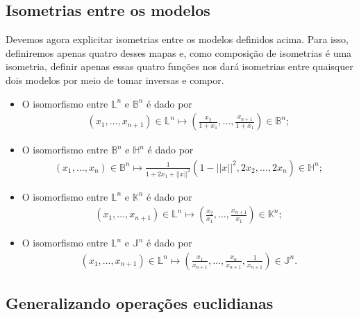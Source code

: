 \documentclass{article}
\begin{document}
\subsection{Isometrias entre os modelos}

Devemos agora explicitar isometrias entre os modelos definidos acima. Para isso, definiremos apenas quatro desses mapas e, como composição de isometrias é uma isometria, definir apenas essas quatro funções nos dará isometrias entre quaisquer dois modelos por meio de tomar inversas e compor.

\begin{itemize}
    \item O isomorfismo entre $\mathbb{L}^n$ e $\mathbb{B}^n$ é dado por \begin{align}
        (x_1, \dots, x_{n+1}) \in \mathbb{L}^n \mapsto \left(\frac{x_2}{1 + x_1}, \dots, \frac{x_{n+1}}{1 + x_1}\right) \in \mathbb{B}^n;
    \end{align}

    \item O isomorfismo entre $\mathbb{B}^n$ e $\mathbb{H}^n$ é dado por \begin{align}
        (x_1, \dots, x_n) \in \mathbb{B}^n \mapsto \frac{1}{1 + 2x_1 + ||x||^2}(1 - ||x||^2, 2x_2, \dots, 2x_n) \in \mathbb{H}^n;
    \end{align}

    \item O isomorfismo entre $\mathbb{L}^n$ e $\mathbb{K}^n$ é dado por \begin{align}
        (x_1, \dots, x_{n+1}) \in \mathbb{L}^n \mapsto \left(\frac{x_2}{x_1}, \dots, \frac{x_{n+1}}{x_1}\right) \in \mathbb{K}^n;
    \end{align}

    \item O isomorfismo entre $\mathbb{L}^n$ e $\mathbb{J}^n$ é dado por \begin{align}
        (x_1, \dots, x_{n+1}) \in \mathbb{L}^n \mapsto \left(\frac{x_1}{x_{n+1}}, \dots, \frac{x_n}{x_{n+1}}, \frac{1}{x_{n+1}}\right) \in \mathbb{J}^n.
    \end{align}
\end{itemize}

\subsection{Generalizando operações euclidianas}
\end{document}
